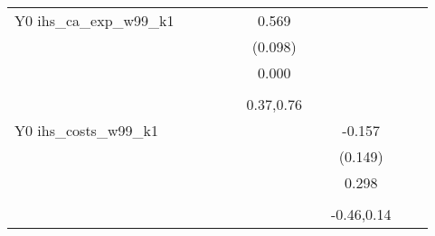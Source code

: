 \begin{table}[!h]
\begin{adjustbox}{width=\columnwidth,center}
\begin{tabular}{l*{8}{c}}
Y0 ihs\_ca\_exp\_w99\_k1&                     &                     &                     &                     &       0.569\sym{***}&                     &                     &                     &                     &                     \\
                    &                     &                     &                     &                     &     (0.098)         &                     &                     &                     &                     &                     \\
                    &                     &                     &                     &                     &       0.000         &                     &                     &                     &                     &                     \\
                    &                     &                     &                     &                     &                     &                     &                     &                     &                     &                     \\
                    &                     &                     &                     &                     &   0.37,0.76         &                     &                     &                     &                     &                     \\
Y0 ihs\_costs\_w99\_k1 &                     &                     &                     &                     &                     &                     &      -0.157         &                     &                     &                     \\
                    &                     &                     &                     &                     &                     &                     &     (0.149)         &                     &                     &                     \\
                    &                     &                     &                     &                     &                     &                     &       0.298         &                     &                     &                     \\
                    &                     &                     &                     &                     &                     &                     &                     &                     &                     &                     \\
                    &                     &                     &                     &                     &                     &                     &  -0.46,0.14         &                     &                     &                     \\

\end{tabular}
\end{adjustbox}
\end{table}

